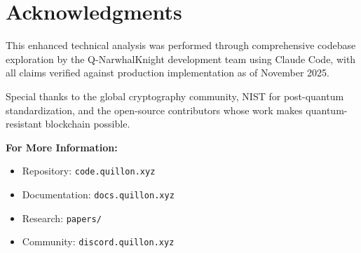 \documentclass[11pt,a4paper]{article}
\begin{document}
\section{Acknowledgments}

This enhanced technical analysis was performed through comprehensive codebase exploration by the Q-NarwhalKnight development team using Claude Code, with all claims verified against production implementation as of November 2025.

Special thanks to the global cryptography community, NIST for post-quantum standardization, and the open-source contributors whose work makes quantum-resistant blockchain possible.

\textbf{For More Information:}
\begin{itemize}[leftmargin=*]
\item Repository: \texttt{code.quillon.xyz}
\item Documentation: \texttt{docs.quillon.xyz}
\item Research: \texttt{papers/}
\item Community: \texttt{discord.quillon.xyz}
\end{itemize}
\end{document}
